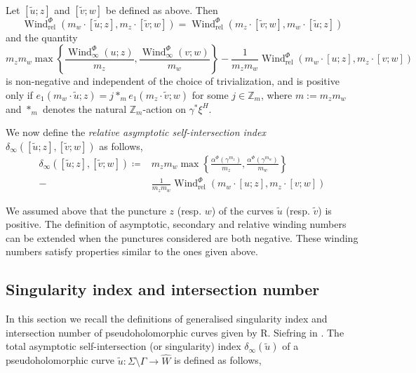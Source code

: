 \documentclass[11pt, a4paper]{amsart}
\DeclareMathOperator{\wind}{Wind}
\begin{document}
\begin{lemma}\cite[Section~3.1]{Siefinter2009}\label{relasymp_nonzero}
Let $[\tilde{u}; z]$ and $[\tilde{v}; w]$ be defined as above. Then
$$\wind^{\Phi}_{\mathrm{rel}}\left(m_w\cdot[\tilde{u}; z], m_z\cdot[\tilde{v}; w]\right)=\wind^{\Phi}_{\mathrm{rel}}\left(m_z\cdot[\tilde{v}; w],m_w\cdot[\tilde{u}; z]\right)$$ and the quantity
\begin{equation*}
       m_z m_w \max\left\{\frac{\wind^{\Phi}_{\infty}(u; z)}{m_z}, \frac{\wind^{\Phi}_{\infty}(v; w)}{m_w}\right\} 
       -\frac{1}{m_z m_w} \wind^{\Phi}_{\mathrm{rel}} \left(m_w {\cdot} [u; z], m_z {\cdot}[v; w]\right)
\end{equation*}
is non-negative and independent of the choice of trivialization, and is positive only if $e_1 (m_w {\cdot} \tilde{u}; z)= j *_{m} e_1 (m_z{\cdot}\tilde{v}; w)$ for some $j \in \mathbb{Z}_{m}$, where $m:=m_zm_w$ and $*_{m}$ denotes the natural $\mathbb{Z}_{m}$-action on  $\gamma^{*}\xi^{H}$.
\end{lemma}
We now define the \textit{relative asymptotic self-intersection index}  $\delta_{\infty}([\tilde{u}; z], [\tilde{v}; w])$ as follows,
\begin{equation*}
    \begin{split}
       \delta_{\infty}([\tilde{u}; z], [\tilde{v}; w]) \coloneqq & m_z m_w \max\left\{\frac{\alpha^{\Phi}(\gamma^{m_z})}{m_z}, \frac{\alpha^{\Phi}(\gamma^{m_w})}{m_w}\right\} \\ 
       -&\frac{1}{m_z m_w} \wind^{\Phi}_{\mathrm{rel}} \left(m_w \cdot [u; z], m_z \cdot [v; w]\right) 
    \end{split}
\end{equation*}

\begin{remark}
We assumed above that the puncture $z$ (resp. $w$) of the curves $\tilde{u}$ (resp. $\tilde{v}$) is positive. The definition of asymptotic, secondary and relative winding numbers can be extended when the punctures considered are both negative. These winding numbers satisfy properties similar to the ones given above.
\end{remark}


\subsection{Singularity index and intersection number}\label{intersection number and singularity index}

In this section we recall the definitions of generalised singularity index and intersection number of pseudoholomorphic curves given by R. Siefring in \cite{Siefinter2009}. The total asymptotic self-intersection (or singularity) index $\delta_{\infty}(\tilde{u})$ of a pseudoholomorphic curve $\tilde{u}: \Sigma\setminus \Gamma \rightarrow \widehat{W}$ is defined as follows,
\end{document}
